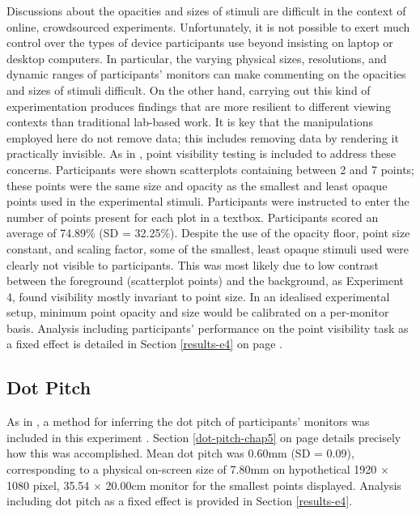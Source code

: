 \documentclass[../main.tex]{subfiles}
\begin{document}
Discussions about the opacities and sizes of stimuli are difficult in
the context of online, crowdsourced experiments. Unfortunately, it is
not possible to exert much control over the types of device participants
use beyond insisting on laptop or desktop computers. In particular, the
varying physical sizes, resolutions, and dynamic ranges of participants'
monitors can make commenting on the opacities and sizes of stimuli
difficult. On the other hand, carrying out this kind of experimentation
produces findings that are more resilient to different viewing contexts
than traditional lab-based work. It is key that the manipulations
employed here do not remove data; this includes removing data by
rendering it practically invisible. As in ,
point visibility testing is included to address these concerns.
Participants were shown scatterplots containing between 2 and 7 points;
these points were the same size and opacity as the smallest and least
opaque points used in the experimental stimuli. Participants were
instructed to enter the number of points present for each plot in a
textbox. Participants scored an average of 74.89\% (SD = 32.25\%).
Despite the use of the opacity floor, point size constant, and scaling
factor, some of the smallest, least opaque stimuli used were clearly not
visible to participants. This was most likely due to low contrast
between the foreground (scatterplot points) and the background, as
Experiment 4,  found visibility mostly
invariant to point size. In an idealised experimental setup, minimum
point opacity and size would be calibrated on a per-monitor basis.
Analysis including participants' performance on the point visibility
task as a fixed effect is detailed in Section \ref{results-e4} on page
\pageref{results-e4}.

\subsection{Dot Pitch}\label{dot-pitch}

As in , a method for inferring the dot pitch
of participants' monitors was included in this experiment
\cite{screenscale}. Section \ref{dot-pitch-chap5} on page
\pageref{dot-pitch-chap5} details precisely how this was accomplished.
Mean dot pitch was 0.60mm (SD = 0.09), corresponding to a physical
on-screen size of 7.80mm on hypothetical 1920 \(\times\) 1080 pixel,
35.54 \(\times\) 20.00cm monitor for the smallest points displayed.
Analysis including dot pitch as a fixed effect is provided in Section
\ref{results-e4}.
\end{document}
